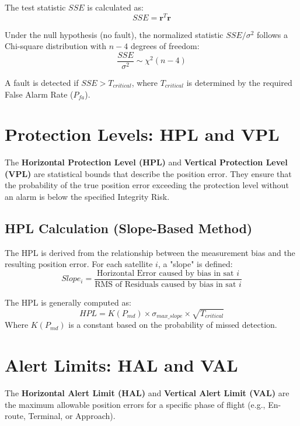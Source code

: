 \documentclass[11pt,a4paper]{article}
\begin{document}
The test statistic $SSE$ is calculated as:
\begin{equation}
    SSE = \mathbf{r}^T \mathbf{r}
\end{equation}

Under the null hypothesis (no fault), the normalized statistic $SSE / \sigma^2$ follows a Chi-square distribution with $n-4$ degrees of freedom:
\begin{equation}
    \frac{SSE}{\sigma^2} \sim \chi^2(n-4)
\end{equation}

A fault is detected if $SSE > T_{critical}$, where $T_{critical}$ is determined by the required False Alarm Rate ($P_{fa}$).

\section{Protection Levels: HPL and VPL}
The \textbf{Horizontal Protection Level (HPL)} and \textbf{Vertical Protection Level (VPL)} are statistical bounds that describe the position error. They ensure that the probability of the true position error exceeding the protection level without an alarm is below the specified Integrity Risk.

\subsection{HPL Calculation (Slope-Based Method)}
The HPL is derived from the relationship between the measurement bias and the resulting position error. For each satellite $i$, a "slope" is defined:
\begin{equation}
    Slope_i = \frac{\text{Horizontal Error caused by bias in sat } i}{\text{RMS of Residuals caused by bias in sat } i}
\end{equation}

The HPL is generally computed as:
\begin{equation}
    HPL = K(P_{md}) \times \sigma_{max\_slope} \times \sqrt{T_{critical}}
\end{equation}
Where $K(P_{md})$ is a constant based on the probability of missed detection.

\section{Alert Limits: HAL and VAL}
The \textbf{Horizontal Alert Limit (HAL)} and \textbf{Vertical Alert Limit (VAL)} are the maximum allowable position errors for a specific phase of flight (e.g., En-route, Terminal, or Approach).
\end{document}

